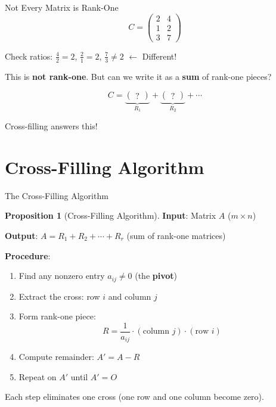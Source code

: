 \documentclass[10pt]{beamer}
\theoremstyle{definition}
\newtheorem{prop}{Proposition}[section]
\newcommand{\x}[1]{\alert{\textbf{#1}}}
\begin{document}
\begin{frame}{Not Every Matrix is Rank-One}
$$C = \begin{pmatrix}
2 & 4 \\
1 & 2 \\
3 & 7
\end{pmatrix}$$

\vfill
Check ratios: $\frac{4}{2} = 2$, \quad $\frac{2}{1} = 2$, \quad $\frac{7}{3} \neq 2$ \quad $\leftarrow$ Different!

\vfill
This is \x{not rank-one}. But can we write it as a \x{sum} of rank-one pieces?

$$C = \underbrace{\begin{pmatrix} ? \end{pmatrix}}_{R_1} + \underbrace{\begin{pmatrix} ? \end{pmatrix}}_{R_2} + \cdots$$

Cross-filling answers this!
\end{frame}

\section{Cross-Filling Algorithm}

\begin{frame}{The Cross-Filling Algorithm}
\begin{prop}[Cross-Filling Algorithm]
\textbf{Input}: Matrix $A$ ($m \times n$)

\textbf{Output}: $A = R_1 + R_2 + \cdots + R_r$ (sum of rank-one matrices)

\textbf{Procedure}:
\begin{enumerate}
\item Find any nonzero entry $a_{ij} \neq 0$ (the \x{pivot})
\item Extract the cross: row $i$ and column $j$
\item Form rank-one piece:
$$R = \frac{1}{a_{ij}} \cdot (\text{column } j) \cdot (\text{row } i)$$
\item Compute remainder: $A' = A - R$
\item Repeat on $A'$ until $A' = O$
\end{enumerate}
\end{prop}

\vfill
Each step eliminates one cross (one row and one column become zero).
\end{frame}
\end{document}
